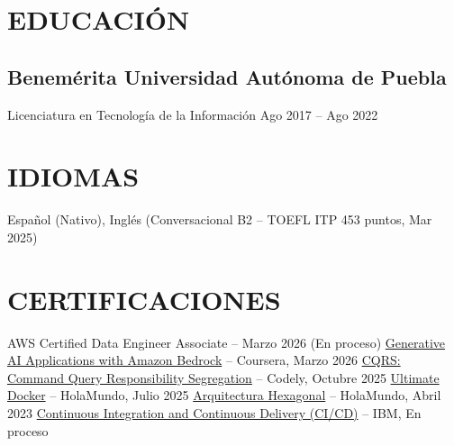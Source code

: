 \documentclass[a4paper,10pt]{article}
\begin{document}
\section*{EDUCACIÓN}

\subsection*{\small Benemérita Universidad Autónoma de Puebla}
Licenciatura en Tecnología de la Información \hfill Ago 2017 -- Ago 2022

\section*{IDIOMAS}
Español (Nativo), Inglés (Conversacional B2 -- TOEFL ITP 453 puntos, Mar 2025)

\section*{CERTIFICACIONES}
 AWS Certified Data Engineer Associate -- Marzo 2026 (En proceso)
 \href{https://coursera.org/verify/HEG7YFDO6D1C}{Generative AI Applications with Amazon Bedrock} -- Coursera, Marzo 2026
 \href{https://www.linkedin.com/in/jose-carlos-huerta-garcia-773952212/details/certifications}{CQRS: Command Query Responsibility Segregation} -- Codely, Octubre 2025
 \href{https://academia.holamundo.io/certificates/fifvbfywmp}{Ultimate Docker} -- HolaMundo, Julio 2025
 \href{https://www.linkedin.com/in/jose-carlos-huerta-garcia-773952212/details/certifications/1758852008410/single-media-viewer/?profileId=ACoAADXjsscBqtjtdk4S_qpdkHwZs, Fn9y9TiG0o}{Arquitectura Hexagonal} -- HolaMundo, Abril 2023
 \href{https://www.coursera.org/programs/knu-high-o3k80/learn/continuous-integration-and-continuous-delivery-ci-cd?source=search}{Continuous Integration and Continuous Delivery (CI/CD)} -- IBM, En proceso
\end{document}
